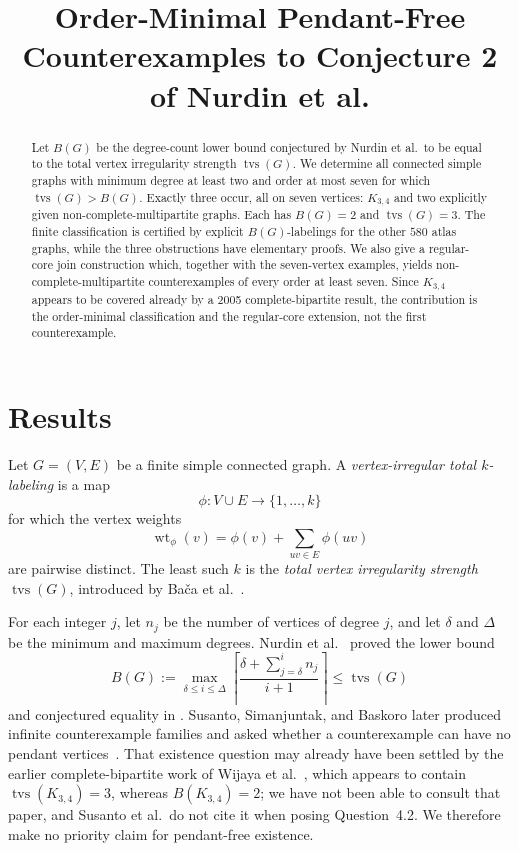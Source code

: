 \documentclass[11pt]{amsart}
\title[Order-minimal pendant-free counterexamples]
{Order-Minimal Pendant-Free Counterexamples to Conjecture 2 of Nurdin et al.}
\date{}
\newcommand{\tvs}{\operatorname{tvs}}
\newcommand{\wt}{\operatorname{wt}}
\begin{document}
\begin{abstract}
Let $B(G)$ be the degree-count lower bound conjectured by Nurdin et al.\ to
be equal to the total vertex irregularity strength $\tvs(G)$. We determine
all connected simple graphs with minimum degree at least two and order at
most seven for which $\tvs(G)>B(G)$. Exactly three occur, all on seven
vertices: $K_{3,4}$ and two explicitly given non-complete-multipartite
graphs. Each has $B(G)=2$ and $\tvs(G)=3$. The finite classification is
certified by explicit $B(G)$-labelings for the other $580$ atlas graphs,
while the three obstructions have elementary proofs. We also give a
regular-core join construction which, together with the seven-vertex
examples, yields non-complete-multipartite counterexamples of every order
at least seven. Since $K_{3,4}$ appears to be covered already by a 2005
complete-bipartite result, the contribution is the order-minimal
classification and the regular-core extension, not the first
counterexample.
\end{abstract}

\maketitle

\section{Results}

Let $G=(V,E)$ be a finite simple connected graph. A \emph{vertex-irregular
total $k$-labeling} is a map
\[
  \phi:V\cup E\longrightarrow\{1,\ldots,k\}
\]
for which the vertex weights
\[
  \wt_\phi(v)=\phi(v)+\sum_{uv\in E}\phi(uv)
\]
are pairwise distinct. The least such $k$ is the \emph{total vertex
irregularity strength} $\tvs(G)$, introduced by Ba\v{c}a et
al.~\cite{Baca2007}.

For each integer $j$, let $n_j$ be the number of vertices of degree $j$,
and let $\delta$ and $\Delta$ be the minimum and maximum degrees. Nurdin et
al.~\cite{Nurdin2010} proved the lower bound
\[
  B(G):=
  \max_{\delta\le i\le\Delta}
  \left\lceil
    \frac{\delta+\sum_{j=\delta}^{i}n_j}{i+1}
  \right\rceil
  \le \tvs(G)
\]
and conjectured equality in \cite[Conjecture~2]{Nurdin2010}. Susanto,
Simanjuntak, and Baskoro later produced infinite counterexample families
and asked whether a counterexample can have no pendant
vertices~\cite[Question~4.2]{Susanto2023}. That existence question may
already have been settled by the earlier complete-bipartite work of Wijaya
et al.~\cite{Wijaya2005}, which appears to contain $\tvs(K_{3,4})=3$,
whereas $B(K_{3,4})=2$; we have not been able to consult that paper, and
Susanto et al.\ do not cite it when posing Question~4.2. We therefore make
no priority claim for pendant-free existence.
\end{document}
